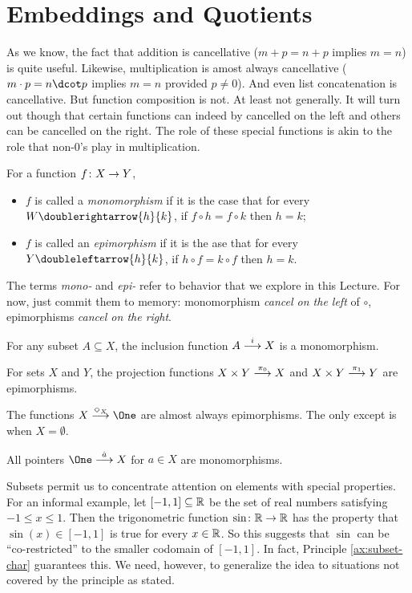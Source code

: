\section{Embeddings and Quotients}

As we know, the fact that addition is cancellative ($m+p=n+p$ implies $m=n$) is quite useful. Likewise, multiplication is amost always cancellative ($m\cdot p=n\dcot p$ implies $m=n$ provided $p\neq 0$). And even list concatenation is cancellative. But function composition is not. At least not generally. It will turn out though that certain functions can indeed by cancelled on the left and others can be cancelled on the right. The role of these special functions is akin to the role that non-$0$'s play in multiplication.

\begin{defn}
	For a function $\fromto fXY$,
	\begin{itemize}
		\item $f$ is called a \emph{monomorphism} if it is the case that for every $W\doublerightarrow{h}{k}$, if $f\circ h=f\circ k$ then $h=k$;
		\item $f$ is called an \emph{epimorphism} if it is the ase that 
		for every $Y\doubleleftarrow{h}{k}$, if $h\circ f=k\circ f$ then $h=k$.
	\end{itemize}
\end{defn}

The terms \emph{mono-} and \emph{epi-} refer to behavior that we explore in this Lecture. For now, just commit them to memory: monomorphism \emph{cancel on the left} of $\circ$, epimorphisms \emph{cancel on the right}.

\begin{example}
	For any subset $A\subseteq X$, the inclusion function $\sfromto iAX$ is a monomorphism.
	
	For sets $X$ and $Y$, the projection functions $\sfromto {\pi_0}{X\times Y}X$ and $\sfromto {\pi_1}{X\times Y}Y$ are epimorphisms.
	
	The functions $\sfromto {\Diamond_X}X\One$ are almost always epimorphisms. The only except is when $X=\emptyset$.
	
	All pointers $\sfromto {\hat a}{\One}X$ for $a\in X$ are monomorphisms.
	
	
\end{example}
Subsets permit us to concentrate attention on elements with special properties.
For an informal example, let $[-1,1]\subseteq\RR$ be the set of real numbers satisfying $-1\leq x\leq 1$.
Then the trigonometric function $\fromto \sin\RR\RR$ has the property that $\sin(x)\in [-1,1]$ is true for every $x\in\RR$.
So this suggests that $\sin$ can be ``co-restricted'' to the smaller codomain of $[-1,1]$. In fact, Principle \ref{ax:subset-char} guarantees this.
We need, however, to generalize the idea to situations not covered by the principle as stated.

